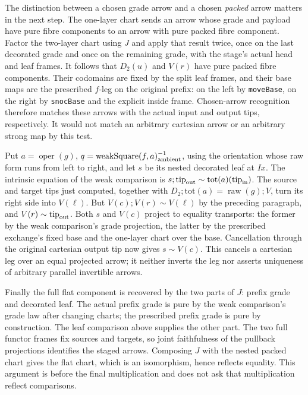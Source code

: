 \documentclass[11pt]{article}
\begin{document}
\par The distinction between a chosen grade arrow and a chosen \emph{packed} arrow matters in the next step. The one-layer chart sends an arrow whose grade and payload have pure fibre components to an arrow with pure packed fibre component. Factor the two-layer chart using $J$ and apply that result twice, once on the last decorated grade and once on the remaining grade, with the stage's actual head and leaf frames. It follows that $D_2(u)$ and $V(r)$ have pure packed fibre components. Their codomains are fixed by the split leaf frames, and their base maps are the prescribed $f$-leg on the original prefix: on the left by \texttt{moveBase}, on the right by \texttt{snocBase} and the explicit inside frame. Chosen-arrow recognition therefore matches these arrows with the actual input and output tips, respectively. It would not match an arbitrary cartesian arrow or an arbitrary strong map by this test.
\par Put $a=\operatorname{oper}(g)$, $q=\operatorname{weakSquare}(f,a)^{-1}_{\rm ambient}$, using the orientation whose raw form runs from left to right, and let $s$ be its nested decorated leaf at $I x$. The intrinsic equation of the weak comparison is $s;\mathrm{tip}_{\rm out}\sim \mathrm{tot}(a)(\mathrm{tip}_{\rm in})$. The source and target tips just computed, together with $D_2;\mathrm{tot}(a)=\operatorname{raw}(g);V$, turn its right side into $V(\ell)$. But $V(c);V(r)\sim V(\ell)$ by the preceding paragraph, and $V(r)\sim\mathrm{tip}_{\rm out}$. Both $s$ and $V(c)$ project to equality transports: the former by the weak comparison's grade projection, the latter by the prescribed exchange's fixed base and the one-layer chart over the base. Cancellation through the original cartesian output tip now gives $s\sim V(c)$. This cancels a cartesian leg over an equal projected arrow; it neither inverts the leg nor asserts uniqueness of arbitrary parallel invertible arrows.
\par Finally the full flat component is recovered by the two parts of $J$: prefix grade and decorated leaf. The actual prefix grade is pure by the weak comparison's grade law after changing charts; the prescribed prefix grade is pure by construction. The leaf comparison above supplies the other part. The two full functor frames fix sources and targets, so joint faithfulness of the pullback projections identifies the staged arrows. Composing $J$ with the nested packed chart gives the flat chart, which is an isomorphism, hence reflects equality. This argument is before the final multiplication and does not ask that multiplication reflect comparisons.
\end{document}
